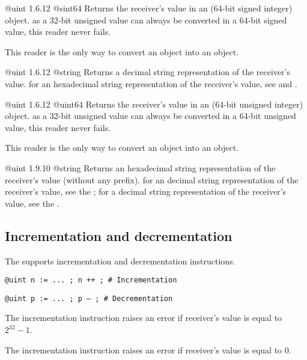 {@uint}
{1.6.12}
{@sint64}
{Returns the receiver's value in an  (64-bit signed integer) object.}
{as a 32-bit unsigned value can always be converted in a 64-bit signed value, this reader never fails.}

This reader is the only way to convert an  object into an  object.


{@uint}
{1.6.12}
{@string}
{Returns a decimal string representation of the receiver's value.}
{for an hexadecimal string representation of the receiver's value, see  and .}




{@uint}
{1.6.12}
{@uint64}
{Returns the receiver's value in an  (64-bit unsigned integer) object.}
{as a 32-bit unsigned value can always be converted in a 64-bit unsigned value, this reader never fails.}

This reader is the only way to convert an  object into an  object.




{@uint}
{1.9.10}
{@string}
{Returns an hexadecimal string representation of the receiver's value (without any prefix).}
{for an decimal string representation of the receiver's value, see the ; for a decimal string representation of the receiver's value, see the .}






\subsection{Incrementation and decrementation}

The  supports incrementation and decrementation instructions.

\texttt{@uint n := ... ; n ++ ; \# Incrementation}

\texttt{@uint p := ... ; p -- ; \# Decrementation}\newline

The incrementation instruction raises an error if receiver's value is equal to $2^{32}-1$.\newline

The incrementation instruction raises an error if receiver's value is equal to 0.\newline

